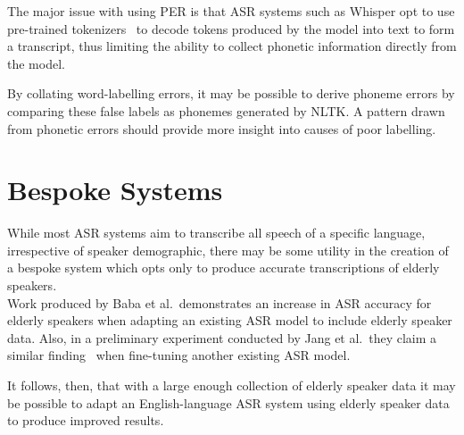 The major issue with using PER is that ASR systems such as Whisper opt to use pre-trained
tokenizers~\cite{huggingfacetransformers} to decode tokens produced by the model into text to
form a transcript, thus limiting the ability to collect phonetic information directly from the
model.

By collating word-labelling errors, it may be possible to derive phoneme errors by comparing
these false labels as phonemes generated by NLTK\@.
A pattern drawn from phonetic errors should provide more insight into causes of poor labelling.

\section{Bespoke Systems}\label{sec:bespoke-systems}

While most ASR systems aim to transcribe all speech of a specific language, irrespective of
speaker demographic, there may be some utility in the creation of a bespoke system which opts
only to produce accurate transcriptions of elderly speakers.\\

Work produced by Baba et al.\ demonstrates an increase in ASR accuracy for elderly speakers when
adapting an existing ASR model to include elderly speaker data\cite{baba2004}.
Also, in a preliminary experiment conducted by Jang et al.\ they claim a similar
finding~\cite{vote400} when fine-tuning another existing ASR model.

It follows, then, that with a large enough collection of elderly speaker data it may be possible
to adapt an English-language ASR system using elderly speaker data to produce improved results.